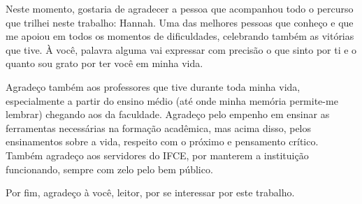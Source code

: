 \begin{agradecimentos}
Neste momento, gostaria de agradecer a pessoa que acompanhou todo o percurso que trilhei neste trabalho: Hannah. Uma das melhores pessoas que conheço e que me apoiou em todos os momentos de dificuldades, celebrando também as vitórias que tive. À você, palavra alguma vai expressar com precisão o que sinto por ti e o quanto sou grato por ter você em minha vida.

Agradeço também aos professores que tive durante toda minha vida, especialmente a partir do ensino médio (até onde minha memória permite-me lembrar) chegando aos da faculdade. Agradeço pelo empenho em ensinar as ferramentas necessárias na formação acadêmica, mas acima disso, pelos ensinamentos sobre a vida, respeito com o próximo e pensamento crítico. Também agradeço aos servidores do IFCE, por manterem a instituição funcionando, sempre com zelo pelo bem público.

Por fim, agradeço à você, leitor, por se interessar por este trabalho.
\end{agradecimentos}